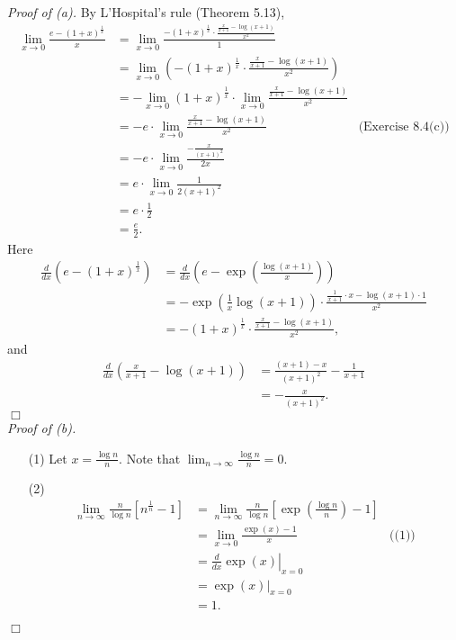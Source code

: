 \documentclass{article}
\begin{document}
\emph{Proof of (a).}
By L'Hospital's rule (Theorem 5.13),
\begin{align*}
  \lim_{x \to 0} \frac{e-(1+x)^{\frac{1}{x}}}{x}
  &= \lim_{x \to 0} \frac{-(1+x)^{\frac{1}{x}} \cdot
    \frac{ \frac{x}{x+1} - \log(x+1) }{x^2}}{1} \\
  &= \lim_{x \to 0} \left( -(1+x)^{\frac{1}{x}} \cdot
    \frac{ \frac{x}{x+1} - \log(x+1) }{x^2} \right) \\
  &= - \lim_{x \to 0}(1+x)^{\frac{1}{x}} \cdot
    \lim_{x \to 0} \frac{ \frac{x}{x+1} - \log(x+1) }{x^2} \\
  &= -e \cdot
    \lim_{x \to 0} \frac{ \frac{x}{x+1} - \log(x+1) }{x^2}
    &\text{(Exercise 8.4(c))} \\
  &= -e \cdot \lim_{x \to 0} \frac{ -\frac{x}{(x+1)^2} }{2x} \\
  &= e \cdot \lim_{x \to 0} \frac{1}{2(x+1)^2} \\
  &= e \cdot \frac{1}{2} \\
  &= \frac{e}{2}.
\end{align*}
Here
\begin{align*}
  \frac{d}{dx}\left( e-(1+x)^{\frac{1}{x}} \right)
  &= \frac{d}{dx}\left( e-\exp\left( \frac{\log(x+1)}{x} \right) \right) \\
  &= -\exp\left( \frac{1}{x} \log(x+1) \right) \cdot
    \frac{ \frac{1}{x+1} \cdot x - \log(x+1) \cdot 1 }{x^2} \\
  &= -(1+x)^{\frac{1}{x}} \cdot \frac{ \frac{x}{x+1} - \log(x+1) }{x^2},
\end{align*}
and
\begin{align*}
  \frac{d}{dx}\left( \frac{x}{x+1} - \log(x+1) \right)
  &= \frac{(x+1) - x}{(x+1)^2} - \frac{1}{x+1} \\
  &= -\frac{x}{(x+1)^2}.
\end{align*}
$\Box$ \\



\emph{Proof of (b).}
\begin{enumerate}
\item[(1)]
Let $x = \frac{\log n}{n}$.
Note that $\lim_{n \to \infty} \frac{\log n}{n} = 0$.

\item[(2)]
\begin{align*}
  \lim_{n \to \infty} \frac{n}{\log n}\left[ n^{\frac{1}{n}} - 1 \right]
  &= \lim_{n \to \infty} \frac{n}{\log n}\left[ \exp\left( \frac{\log n}{n} \right) - 1 \right] \\
  &= \lim_{x \to 0} \frac{\exp(x) - 1}{x}
    &\text{((1))} \\
  &= \left.\frac{d}{dx} \exp(x) \right\vert_{x=0} \\
  &= \left.\exp(x) \right\vert_{x=0} \\
  &= 1.
\end{align*}
\end{enumerate}
$\Box$ \\
\end{document}
